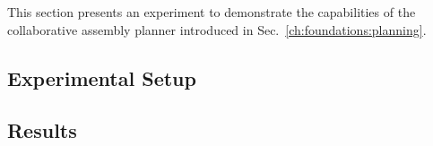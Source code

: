 This section presents an experiment to demonstrate the capabilities of the collaborative assembly planner introduced in Sec.~\ref{ch:foundations:planning}.

\subsection{Experimental Setup}

\subsection{Results}
